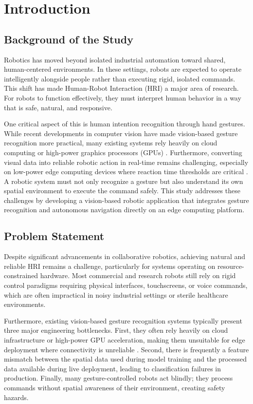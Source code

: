 
\chapter{Introduction}

\section{Background of the Study}
Robotics has moved beyond isolated industrial automation toward shared, human-centered environments. In these settings, robots are expected to operate intelligently alongside people rather than executing rigid, isolated commands. This shift has made Human-Robot Interaction (HRI) a major area of research. For robots to function effectively, they must interpret human behavior in a way that is safe, natural, and responsive. 

One critical aspect of this is human intention recognition through hand gestures. While recent developments in computer vision have made vision-based gesture recognition more practical, many existing systems rely heavily on cloud computing or high-power graphics processors (GPUs) \cite{mahmud2022}. Furthermore, converting visual data into reliable robotic action in real-time remains challenging, especially on low-power edge computing devices where reaction time thresholds are critical \cite{tsitos2022}. A robotic system must not only recognize a gesture but also understand its own spatial environment to execute the command safely. This study addresses these challenges by developing a vision-based robotic application that integrates gesture recognition and autonomous navigation directly on an edge computing platform.

\section{Problem Statement}
Despite significant advancements in collaborative robotics, achieving natural and reliable HRI remains a challenge, particularly for systems operating on resource-constrained hardware. Most commercial and research robots still rely on rigid control paradigms requiring physical interfaces, touchscreens, or voice commands, which are often impractical in noisy industrial settings or sterile healthcare environments. 

Furthermore, existing vision-based gesture recognition systems typically present three major engineering bottlenecks. First, they often rely heavily on cloud infrastructure or high-power GPU acceleration, making them unsuitable for edge deployment where connectivity is unreliable \cite{mahmud2022}. Second, there is frequently a feature mismatch between the spatial data used during model training and the processed data available during live deployment, leading to classification failures in production. Finally, many gesture-controlled robots act blindly; they process commands without spatial awareness of their environment, creating safety hazards. 

